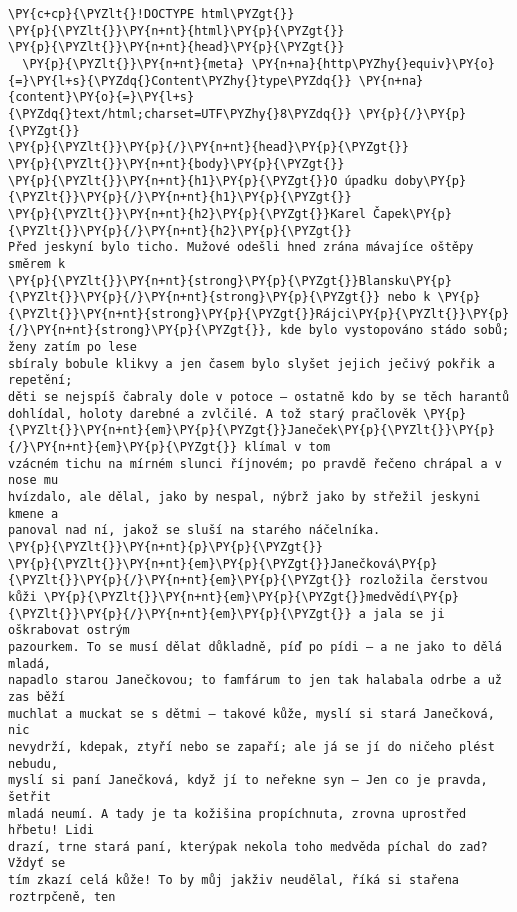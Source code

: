 \begin{Verbatim}[commandchars=\\\{\}]
\PY{c+cp}{\PYZlt{}!DOCTYPE html\PYZgt{}}
\PY{p}{\PYZlt{}}\PY{n+nt}{html}\PY{p}{\PYZgt{}}
\PY{p}{\PYZlt{}}\PY{n+nt}{head}\PY{p}{\PYZgt{}}
  \PY{p}{\PYZlt{}}\PY{n+nt}{meta} \PY{n+na}{http\PYZhy{}equiv}\PY{o}{=}\PY{l+s}{\PYZdq{}Content\PYZhy{}type\PYZdq{}} \PY{n+na}{content}\PY{o}{=}\PY{l+s}{\PYZdq{}text/html;charset=UTF\PYZhy{}8\PYZdq{}} \PY{p}{/}\PY{p}{\PYZgt{}}
\PY{p}{\PYZlt{}}\PY{p}{/}\PY{n+nt}{head}\PY{p}{\PYZgt{}}
\PY{p}{\PYZlt{}}\PY{n+nt}{body}\PY{p}{\PYZgt{}}
\PY{p}{\PYZlt{}}\PY{n+nt}{h1}\PY{p}{\PYZgt{}}O úpadku doby\PY{p}{\PYZlt{}}\PY{p}{/}\PY{n+nt}{h1}\PY{p}{\PYZgt{}}
\PY{p}{\PYZlt{}}\PY{n+nt}{h2}\PY{p}{\PYZgt{}}Karel Čapek\PY{p}{\PYZlt{}}\PY{p}{/}\PY{n+nt}{h2}\PY{p}{\PYZgt{}}
Před jeskyní bylo ticho. Mužové odešli hned zrána mávajíce oštěpy směrem k
\PY{p}{\PYZlt{}}\PY{n+nt}{strong}\PY{p}{\PYZgt{}}Blansku\PY{p}{\PYZlt{}}\PY{p}{/}\PY{n+nt}{strong}\PY{p}{\PYZgt{}} nebo k \PY{p}{\PYZlt{}}\PY{n+nt}{strong}\PY{p}{\PYZgt{}}Rájci\PY{p}{\PYZlt{}}\PY{p}{/}\PY{n+nt}{strong}\PY{p}{\PYZgt{}}, kde bylo vystopováno stádo sobů; ženy zatím po lese
sbíraly bobule klikvy a jen časem bylo slyšet jejich ječivý pokřik a repetění;
děti se nejspíš čabraly dole v potoce – ostatně kdo by se těch harantů
dohlídal, holoty darebné a zvlčilé. A tož starý pračlověk \PY{p}{\PYZlt{}}\PY{n+nt}{em}\PY{p}{\PYZgt{}}Janeček\PY{p}{\PYZlt{}}\PY{p}{/}\PY{n+nt}{em}\PY{p}{\PYZgt{}} klímal v tom
vzácném tichu na mírném slunci říjnovém; po pravdě řečeno chrápal a v nose mu
hvízdalo, ale dělal, jako by nespal, nýbrž jako by střežil jeskyni kmene a
panoval nad ní, jakož se sluší na starého náčelníka.
\PY{p}{\PYZlt{}}\PY{n+nt}{p}\PY{p}{\PYZgt{}}
\PY{p}{\PYZlt{}}\PY{n+nt}{em}\PY{p}{\PYZgt{}}Janečková\PY{p}{\PYZlt{}}\PY{p}{/}\PY{n+nt}{em}\PY{p}{\PYZgt{}} rozložila čerstvou kůži \PY{p}{\PYZlt{}}\PY{n+nt}{em}\PY{p}{\PYZgt{}}medvědí\PY{p}{\PYZlt{}}\PY{p}{/}\PY{n+nt}{em}\PY{p}{\PYZgt{}} a jala se ji oškrabovat ostrým
pazourkem. To se musí dělat důkladně, píď po pídi – a ne jako to dělá mladá,
napadlo starou Janečkovou; to famfárum to jen tak halabala odrbe a už zas běží
muchlat a muckat se s dětmi – takové kůže, myslí si stará Janečková, nic
nevydrží, kdepak, ztyří nebo se zapaří; ale já se jí do ničeho plést nebudu,
myslí si paní Janečková, když jí to neřekne syn – Jen co je pravda, šetřit
mladá neumí. A tady je ta kožišina propíchnuta, zrovna uprostřed hřbetu! Lidi
drazí, trne stará paní, kterýpak nekola toho medvěda píchal do zad? Vždyť se
tím zkazí celá kůže! To by můj jakživ neudělal, říká si stařena roztrpčeně, ten

\end{Verbatim}
